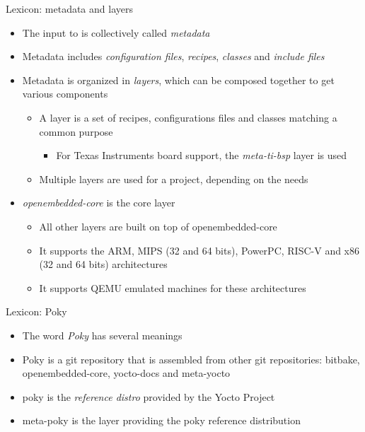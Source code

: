 \begin{frame}{Lexicon: metadata and layers}
  \begin{itemize}
    \item The input to  is collectively called {\em metadata}
    \item Metadata includes {\em configuration files}, {\em recipes}, {\em
      classes} and {\em include files}
    \item Metadata is organized in {\em layers}, which can be composed
      together to get various components
      \begin{itemize}
        \item A layer is a set of recipes, configurations files and classes
          matching a common purpose
      \begin{itemize}
        \item For Texas Instruments board support, the {\em meta-ti-bsp}
          layer is used
      \end{itemize}
      \item Multiple layers are used for a project, depending on the needs
      \end{itemize}
    \item {\em openembedded-core} is the core layer
      \begin{itemize}
        \item All other layers are built on top of openembedded-core
        \item It supports the ARM, MIPS (32 and 64 bits), PowerPC, RISC-V
          and x86 (32 and 64 bits) architectures
        \item It supports QEMU emulated machines for these architectures
      \end{itemize}
  \end{itemize}
\end{frame}

\begin{frame}{Lexicon: Poky}
  \begin{itemize}
  \item The word {\em Poky} has several meanings
  \item Poky is a git repository that is assembled from other git
    repositories: bitbake, openembedded-core, yocto-docs and meta-yocto
  \item poky is the {\em reference distro} provided by the Yocto Project
  \item meta-poky is the layer providing the poky reference distribution
  \end{itemize}
\end{frame}

